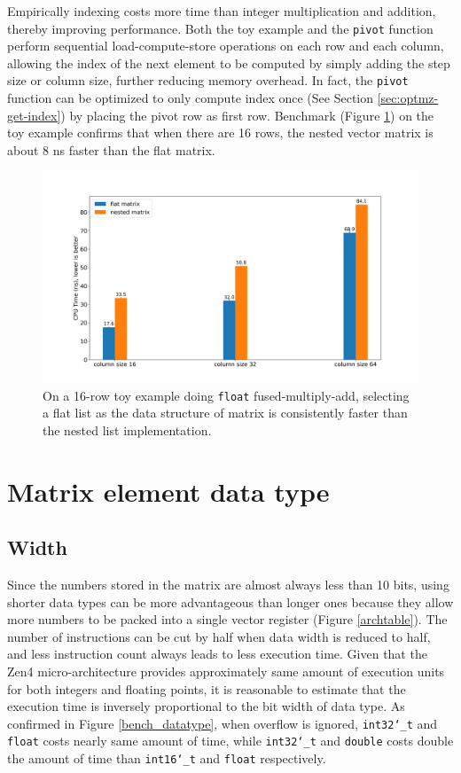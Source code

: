 \documentclass[logo,bsc,singlespacing,parskip]{infthesis}
\newcommand{\dtshort}{\texttt{int16\char`_t}}
\newcommand{\dtint}{\texttt{int32\char`_t}}
\newcommand{\dtfloat}{\texttt{float}}
\newcommand{\dtdouble}{\texttt{double}}
\newcommand{\pivot}{\texttt{pivot}}
\begin{document}
Empirically indexing costs more time than integer multiplication and addition,
thereby improving performance. Both the toy example and the \pivot{} function
perform sequential load-compute-store operations on each row and each column,
allowing the index of the next element to be computed by simply adding the step
size or column size, further reducing memory overhead. In fact, the \pivot{}
function can be optimized to only compute index once (See Section
\ref{sec:optmz-get-index}) by placing the pivot row as first row. Benchmark
(Figure \ref{fig:nested-flat}) on the toy example confirms that when there are
16 rows, the nested vector matrix is about 8 ns faster than the flat matrix.

\begin{figure}
    \includegraphics[width=\linewidth]{image/bench_nested_flat.png}
\caption{On a 16-row toy example doing \dtfloat{} fused-multiply-add, selecting
a flat list as the data structure of matrix is consistently faster than the
nested list implementation.  }
    \label{fig:nested-flat}
\end{figure}


\section{Matrix element data type}


\subsection{Width}
\label{sec:width} 
Since the numbers stored in the matrix are almost always less than 10 bits,
using shorter data types can be more advantageous than longer ones because they
allow more numbers to be packed into a single vector register (Figure
\ref{archtable}). The number of instructions can be cut by half when data width
is reduced to half, and less instruction count always leads to less execution
time. Given that the Zen4 micro-architecture provides approximately same amount
of execution units for both integers and floating points, it is reasonable to
estimate that the execution time is inversely proportional to the bit width of
data type. As confirmed in Figure \ref{bench_datatype}, when overflow is
ignored, \dtint{} and \dtfloat{} costs nearly same amount of time, while
\dtint{} and \dtdouble{} costs double the amount of time than \dtshort{} and
\dtfloat{} respectively.
\end{document}
